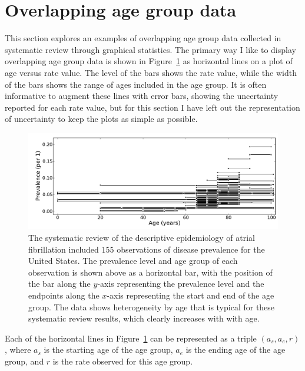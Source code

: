 \section{Overlapping age group data}
\label{theory-age_group_model-overlapping_data}
This section explores an examples of overlapping age group data
collected in systematic review through graphical statistics.  The
primary way I like to display overlapping age group data is shown in
Figure~\ref{theory-age_group_model-dismod_data_plot} as horizontal
lines on a plot of age versus rate value.  The level of the bars shows
the rate value, while the width of the bars shows the range of ages
included in the age group. It is often informative to augment these
lines with error bars, showing the uncertainty reported for each rate
value, but for this section I have left out the representation of
uncertainty to keep the plots as simple as possible.

\begin{figure}[ht]
\begin{center}
\includegraphics[width=\textwidth]{af_ages_intervals.pdf}
\caption{The systematic review of the descriptive epidemiology of
  atrial fibrillation included $155$ observations of disease prevalence for the United States.
 The prevalence level and age group of
  each observation is shown above as a horizontal bar, with the
  position of the bar along the $y$-axis representing the prevalence
  level and the endpoints along the $x$-axis representing the start and
  end of the age group.  The data shows heterogeneity by age that is
  typical for these systematic review results, which clearly increases with
 with age.  }
\label{theory-age_group_model-dismod_data_plot}
\end{center}
\end{figure}

Each of the horizontal lines in
Figure~\ref{theory-age_group_model-dismod_data_plot} can be
represented as a triple $({a_s}, {a_e}, r)$, where $a_s$ is the
starting age of the age group, $a_e$ is the ending age of the age
group, and $r$ is the rate observed for this age group.

